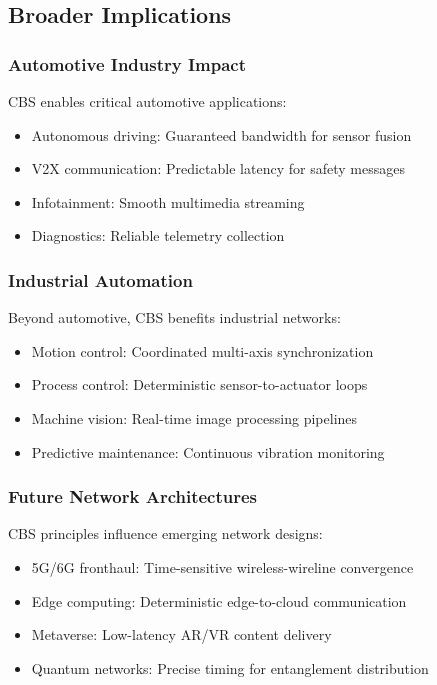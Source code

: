 \documentclass[10pt, journal, compsoc]{IEEEtran}
\begin{document}
\subsection{Broader Implications}

\subsubsection{Automotive Industry Impact}

CBS enables critical automotive applications:
\begin{itemize}
    \item Autonomous driving: Guaranteed bandwidth for sensor fusion
    \item V2X communication: Predictable latency for safety messages
    \item Infotainment: Smooth multimedia streaming
    \item Diagnostics: Reliable telemetry collection
\end{itemize}

\subsubsection{Industrial Automation}

Beyond automotive, CBS benefits industrial networks:
\begin{itemize}
    \item Motion control: Coordinated multi-axis synchronization
    \item Process control: Deterministic sensor-to-actuator loops
    \item Machine vision: Real-time image processing pipelines
    \item Predictive maintenance: Continuous vibration monitoring
\end{itemize}

\subsubsection{Future Network Architectures}

CBS principles influence emerging network designs:
\begin{itemize}
    \item 5G/6G fronthaul: Time-sensitive wireless-wireline convergence
    \item Edge computing: Deterministic edge-to-cloud communication
    \item Metaverse: Low-latency AR/VR content delivery
    \item Quantum networks: Precise timing for entanglement distribution
\end{itemize}
\end{document}
